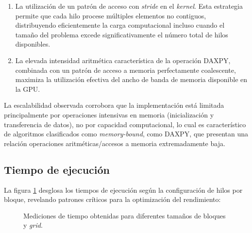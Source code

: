 \begin{itemize}
\begin{enumerate}
                    \item La utilización de un patrón de acceso con \textit{stride} en el \textit{kernel}. Esta estrategia permite que cada hilo procese múltiples elementos no contiguos, distribuyendo eficientemente la carga computacional incluso cuando el tamaño del problema excede significativamente el número total de hilos disponibles.
                    
                    \item La elevada intensidad aritmética característica de la operación DAXPY, combinada con un patrón de acceso a memoria perfectamente coalescente, maximiza la utilización efectiva del ancho de banda de memoria disponible en la GPU.
                    
                \end{enumerate}

        \end{itemize}
        
        La escalabilidad observada corrobora que la implementación está limitada principalmente por operaciones intensivas en memoria (inicialización y transferencia de datos), no por capacidad computacional, lo cual es característico de algoritmos clasificados como \textit{memory-bound}, como DAXPY, que presentan una relación operaciones aritméticas/accesos a memoria extremadamente baja.
        
    \subsection{Tiempo de ejecución}

        La figura \ref{fig:daxpy_times_per_threadsPerBlock} desglosa los tiempos de ejecución según la configuración de hilos por bloque, revelando patrones críticos para la optimización del rendimiento:

        \begin{figure}[H]
            \centering
            \caption{Mediciones de tiempo obtenidas para diferentes tamaños de bloques y \textit{grid}.}
            \label{fig:daxpy_times_per_threadsPerBlock}
        \end{figure}  
        
